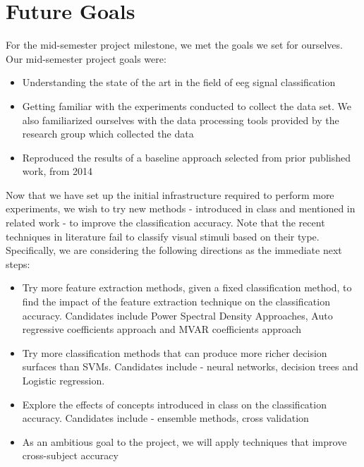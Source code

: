 \documentclass{article} %
\begin{document}
\begin{table}[t]
\begin{center}
\begin{tabular}{c|c|cc|cc}
		\end{tabular}
	\end{center}
\end{table}

\section{Future Goals}

For the mid-semester project milestone, we met the goals we set for ourselves. Our mid-semester project goals were:
\begin{itemize}
	\item Understanding the state of the art in the field of eeg signal classification
	\item Getting familiar with the experiments conducted to collect the data set. We also familiarized ourselves with the data processing tools provided by the research group which collected the data
	\item Reproduced the results of a baseline approach selected from prior published work, from 2014
\end{itemize}

Now that we have set up the initial infrastructure required to perform more experiments, we wish to try new methods - introduced in class and mentioned in related work - to improve the classification accuracy. Note that the recent techniques in literature fail to classify visual stimuli based on their type. Specifically, we are considering the following directions as the immediate next steps:
\begin{itemize}
	\item Try more feature extraction methods, given a fixed classification method, to find the impact of the feature extraction technique on the classification accuracy. Candidates include Power Spectral Density Approaches, Auto regressive coefficients approach and MVAR coefficients approach
	\item Try more classification methods that can produce more richer decision surfaces than SVMs. Candidates include - neural networks, decision trees and Logistic regression. 
	\item Explore the effects of concepts introduced in class on the classification accuracy. Candidates include - ensemble methods, cross validation
	\item As an ambitious goal to the project, we will apply techniques that improve cross-subject accuracy 
\end{itemize}



\end{document}
